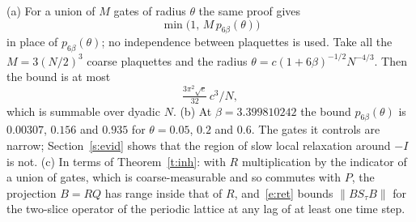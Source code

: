 \begin{remark}\label{r:ret}
(a) For a union of $M$ gates of radius $\theta$ the same proof gives
\[\min\big(1,\,M\,p_{6\beta}(\theta)\big)\]
in place of $p_{6\beta}(\theta)$; no independence between plaquettes is used. Take all the
$M=3(N/2)^3$ coarse plaquettes and the radius $\theta=c(1+6\beta)^{-1/2}N^{-4/3}$. Then the bound is at most
\[\tfrac{3\pi^2\sqrt e}{32}\,c^3/N,\]
which is summable over dyadic $N$. (b) At $\beta=3.399810242$ the bound $p_{6\beta}(\theta)$ is $0.00307$, $0.156$ and $0.935$ for
$\theta=0.05$, $0.2$ and $0.6$. The gates it controls are narrow; Section~\ref{s:evid} shows that the region of
slow local relaxation around $-I$ is not. (c) In terms of Theorem~\ref{t:inh}: with $R$ multiplication by the
indicator of a union of gates, which is coarse-measurable and so commutes with $P$, the projection $B=RQ$ has
range inside that of $R$, and~\eqref{e:ret} bounds $\|BS_\tau B\|$ for the two-slice operator of the periodic
lattice at any lag of at least one time step.
\end{remark}

